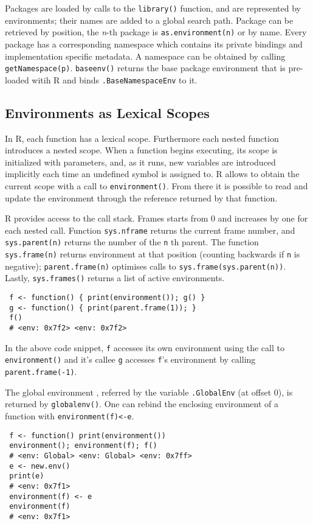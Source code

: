 \documentclass[10pt,sigplan,authorversion=true]{acmart}
\renewcommand{\c}[1]{\lstinline |#1|\xspace}
\begin{document}
Packages are loaded by calls to the \c{library()} function, and are
represented by environments; their names are added to a global search path.
Package can be retrieved by position, the \emph{n}-th package is
\c{as.environment(n)} or by name. Every package has a corresponding namespace
which contains its private bindings and implementation specific metadata. A
namespace can be obtained by calling \c{getNamespace(p)}. \c{baseenv()}
returns the base package environment that is pre-loaded witih R and binds
\c{.BaseNamespaceEnv} to it.


\subsection{Environments as Lexical Scopes}

In R, each function has a lexical scope. Furthermore each nested function
introduces a nested scope. When a function begins executing, its scope is
initialized with parameters, and, as it runs, new variables are introduced
implicitly each time an undefined symbol is assigned to. R allows to obtain the
current scope with a call to \c{environment()}. From there it is possible to
read and update the environment through the reference returned by that function.

R provides access to the call stack. Frames starts from 0 and increases by one
for each nested call. Function \c{sys.nframe} returns the current frame
number, and \c{sys.parent(n)} returns the number of the \c{n}th parent.
The function \c{sys.frame(n)} returns environment at that position (counting
backwards if \c{n} is negative); \c{parent.frame(n)} optimises calls to
\c{sys.frame(sys.parent(n))}. Lastly, \c{sys.frames()} returns a list of
active environments.

\begin{lstlisting}
 f <- function() { print(environment()); g() }
 g <- function() { print(parent.frame(1)); }
 f()
 # <env: 0x7f2> <env: 0x7f2>
\end{lstlisting}

\noindent
In the above code snippet, \c{f} accesses its own environment using the call to
\c{environment()} and it's callee \c{g} accesses \c{f}'s environment by calling
\c{parent.frame(-1)}.

The global environment , referred by the variable \c{.GlobalEnv} (at offset
0), is returned by \c{globalenv()}. One can rebind the enclosing environment
of a function with \c{environment(f)<-e}.

\begin{lstlisting}
 f <- function() print(environment())
 environment(); environment(f); f()
 # <env: Global> <env: Global> <env: 0x7ff>
 e <- new.env()
 print(e)
 # <env: 0x7f1>
 environment(f) <- e
 environment(f)
 # <env: 0x7f1>
\end{lstlisting}
\end{document}
